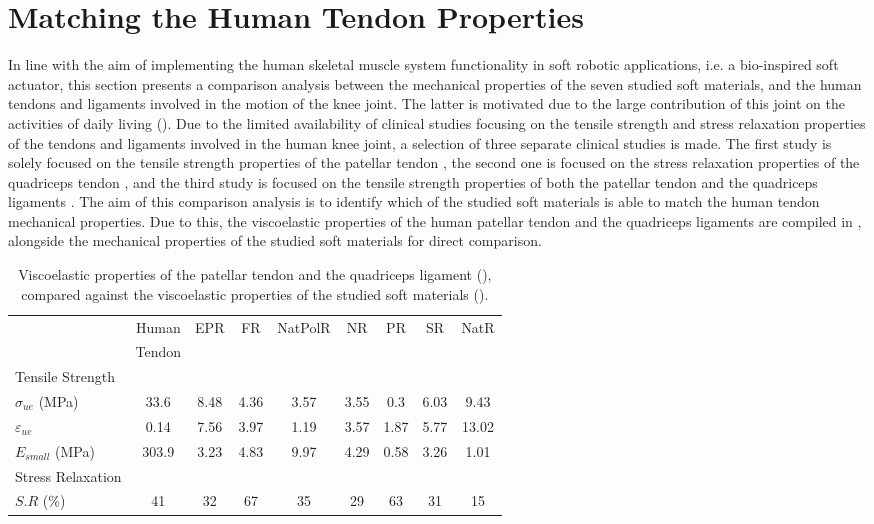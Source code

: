 \section{Matching the Human Tendon Properties}

In line with the aim of implementing the human skeletal muscle system functionality in soft robotic applications, i.e. a bio-inspired soft actuator, this section presents a comparison analysis between the mechanical properties of the seven studied soft materials, and the human tendons and ligaments involved in the motion of the knee joint. The latter is motivated due to the large contribution of this joint on the activities of daily living (). Due to the limited availability of clinical studies focusing on the tensile strength and stress relaxation properties of the tendons and ligaments involved in the human knee joint, a selection of three separate clinical studies is made. The first study is solely focused on the tensile strength properties of the patellar tendon \cite{johnson1994tensile}, the second one is focused on the stress relaxation properties of the quadriceps tendon \cite{schatzmann1998effect}, and the third study is focused on the tensile strength properties of both the patellar tendon and the quadriceps ligaments \cite{staubli1999mechanical}. The aim of this comparison analysis is to identify which of the studied soft materials is able to match the human tendon mechanical properties. Due to this, the viscoelastic properties of the human patellar tendon and the quadriceps ligaments are compiled in , alongside the mechanical properties of the studied soft materials for direct comparison.

\begin{table}[htbp!]
    \centering
    \caption{Viscoelastic properties of the patellar tendon and the quadriceps ligament (\cite{johnson1994tensile,staubli1999mechanical,schatzmann1998effect}), compared against the viscoelastic properties of the studied soft materials ().}
    \begin{tabular}{lcccccccc}
    \toprule
    & Human & EPR & FR & NatPolR & NR & PR & SR & NatR \\
    & Tendon \\
    \hline
	Tensile Strength \\
    \hline
    $\sigma_{ue}$ (MPa)     & 33.6   & 8.48 & 4.36  & 3.57  & 3.55  & 0.3   & 6.03  & 9.43  \\
    $\varepsilon_{ue}$      & 0.14   & 7.56 & 3.97  & 1.19  & 3.57  & 1.87  & 5.77  & 13.02  \\
    $E_{small}$ (MPa)   & 303.9  & 3.23 & 4.83  & 9.97  & 4.29  & 0.58  & 3.26  & 1.01  \\
    \midrule
	Stress Relaxation \\
    \hline
    $S.R$ (\%)                          & 41     & 32    & 67   & 35    & 29    & 63    & 31    & 15\\
    \bottomrule
    \end{tabular}
    \label{tbl:tendon&soft}
\end{table}


